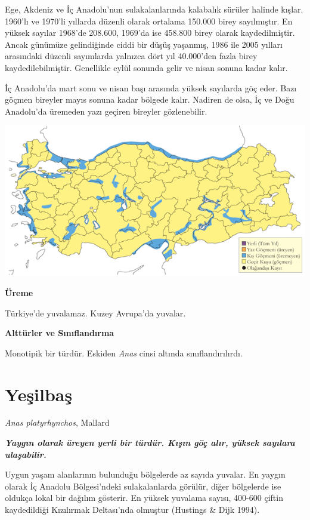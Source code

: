 \documentclass[
  letterpaper,
  DIV=11,
  numbers=noendperiod]{scrreprt}
\begin{document}
Ege, Akdeniz ve İç Anadolu'nun sulakalanlarında kalabalık sürüler
halinde kışlar. 1960'lı ve 1970'li yıllarda düzenli olarak ortalama
150.000 birey sayılmıştır. En yüksek sayılar 1968'de 208.600, 1969'da
ise 458.800 birey olarak kaydedilmiştir. Ancak günümüze gelindiğinde
ciddi bir düşüş yaşanmış, 1986 ile 2005 yılları arasındaki düzenli
sayımlarda yalnızca dört yıl 40.000'den fazla birey kaydedilebilmiştir.
Genellikle eylül sonunda gelir ve nisan sonuna kadar kalır.

İç Anadolu'da mart sonu ve nisan başı arasında yüksek sayılarda göç
eder. Bazı göçmen bireyler mayıs sonuna kadar bölgede kalır. Nadiren de
olsa, İç ve Doğu Anadolu'da üremeden yazı geçiren bireyler gözlenebilir.

\includegraphics{images/harita_Page_015.png}

\textbf{Üreme}

Türkiye'de yuvalamaz. Kuzey Avrupa'da yuvalar.

\textbf{Alttürler ve Sınıflandırma}

Monotipik bir türdür. Eskiden \emph{Anas} cinsi altında
sınıflandırılırdı.

\section{Yeşilbaş}\label{yeux15filbaux15f}

\emph{Anas platyrhynchos}, Mallard

\textbf{\emph{Yaygın olarak üreyen yerli bir türdür. Kışın göç alır,
yüksek sayılara ulaşabilir.}}

Uygun yaşam alanlarının bulunduğu bölgelerde az sayıda yuvalar. En
yaygın olarak İç Anadolu Bölgesi'ndeki sulakalanlarda görülür, diğer
bölgelerde ise oldukça lokal bir dağılım gösterir. En yüksek yuvalama
sayısı, 400-600 çiftin kaydedildiği Kızılırmak Deltası'nda olmuştur
(Hustings \& Dijk 1994).
\end{document}
